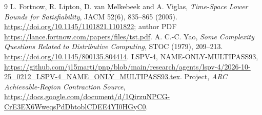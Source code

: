\documentclass[11pt]{article}
\begin{document}
\begin{thebibliography}{9}
 L. Fortnow, R. Lipton, D. van Melkebeek and A. Viglas, \emph{Time-Space Lower Bounds for Satisfiability}, JACM 52(6), 835--865 (2005). \url{https://doi.org/10.1145/1101821.1101822}; author PDF \url{https://lance.fortnow.com/papers/files/tst.pdf}.
 A. C.-C. Yao, \emph{Some Complexity Questions Related to Distributive Computing}, STOC (1979), 209--213. \url{https://doi.org/10.1145/800135.804414}.
 LSPV-4, NAME-ONLY-MULTIPASS93, \url{https://github.com/j15marti/pnp/blob/main/research/agents/lspv-4/2026-10-25_0212_LSPV-4_NAME_ONLY_MULTIPASS93.tex}.
 Project, \emph{ARC Achievable-Region Contraction Source}, \url{https://docs.google.com/document/d/1QirzuNPCG-CrE3EX6WweqsPdDbtoblCDEE4YI0HGyC0}.
\end{thebibliography}
\end{document}
